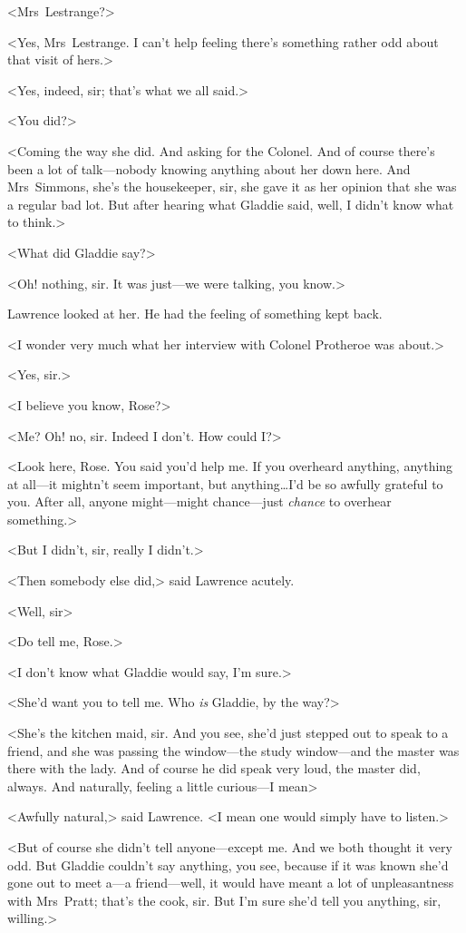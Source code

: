 <Mrs~Lestrange?>

<Yes, Mrs~Lestrange. I can't help feeling there's something rather odd about that visit of hers.>

<Yes, indeed, sir; that's what we all said.>

<You did?>

<Coming the way she did. And asking for the Colonel. And of course there's been a lot of talk—nobody knowing anything about her down here. And Mrs~Simmons, she's the housekeeper, sir, she gave it as her opinion that she was a regular bad lot. But after hearing what Gladdie said, well, I didn't know what to think.>

<What did Gladdie say?>

<Oh! nothing, sir. It was just—we were talking, you know.>

Lawrence looked at her. He had the feeling of something kept back.

<I wonder very much what her interview with Colonel Protheroe was about.>

<Yes, sir.>

<I believe you know, Rose?>

<Me? Oh! no, sir. Indeed I don't. How could I?>

<Look here, Rose. You said you'd help me. If you overheard anything, anything at all—it mightn't seem important, but anything\dots I'd be so awfully grateful to you. After all, anyone might—might chance—just \emph{chance} to overhear something.>

<But I didn't, sir, really I didn't.>

<Then somebody else did,> said Lawrence acutely.

<Well, sir\longdash>

<Do tell me, Rose.>

<I don't know what Gladdie would say, I'm sure.>

<She'd want you to tell me. Who \emph{is} Gladdie, by the way?>

<She's the kitchen maid, sir. And you see, she'd just stepped out to speak to a friend, and she was passing the window—the study window—and the master was there with the lady. And of course he did speak very loud, the master did, always. And naturally, feeling a little curious—I mean\longdash>

<Awfully natural,> said Lawrence. <I mean one would simply have to listen.>

<But of course she didn't tell anyone—except me. And we both thought it very odd. But Gladdie couldn't say anything, you see, because if it was known she'd gone out to meet a—a friend—well, it would have meant a lot of unpleasantness with Mrs~Pratt; that's the cook, sir. But I'm sure she'd tell you anything, sir, willing.>

